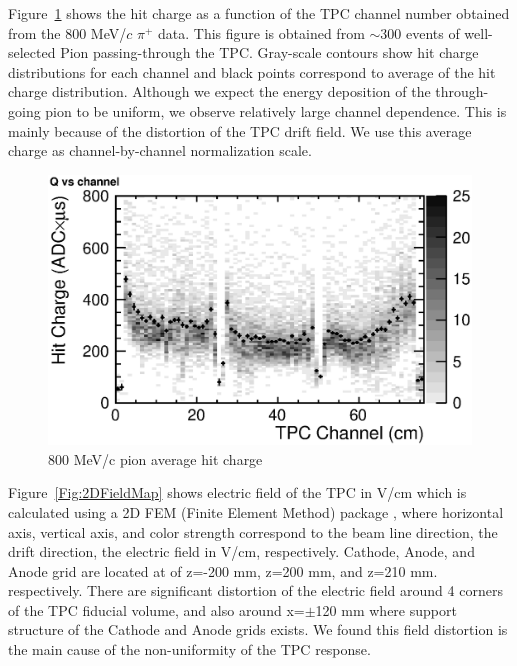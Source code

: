 Figure~\ref{fig:PionQvsCh} shows the hit charge as a function of 
the TPC channel number obtained from the 800 MeV/$c$ $\pi^+$ data. 
This figure is obtained from $\sim$300 events of well-selected Pion passing-through the TPC.
Gray-scale contours show hit charge distributions for
each channel and black points correspond to average of the hit charge distribution.  
Although we expect the energy deposition of the through-going pion to be uniform,
we observe relatively large channel dependence. 
This is mainly because of the distortion of the TPC drift field.
We use this average charge as channel-by-channel normalization scale.

\begin{figure}[htbp]
 \begin{center}
  \includegraphics[width=1.0\hsize]{fig/PionQvsCh.eps}
 \end{center}
 \caption{800 MeV/c pion average hit charge}
 \label{fig:PionQvsCh}
\end{figure}

Figure~\ref{Fig:2DFieldMap} shows electric field of the TPC in V/cm which 
is calculated using a 2D FEM (Finite Element Method) package \cite{Ref:FEMTET},
where horizontal axis, vertical axis, and color strength 
correspond to the beam line direction, the drift direction, the electric field in V/cm, respectively.
Cathode, Anode, and Anode grid are located at of z=-200 mm, z=200 mm, and z=210 mm. respectively.
There are significant distortion of the electric field around 4 corners of the TPC fiducial volume,
and also around x=$\pm$120 mm where support structure of the Cathode and Anode grids exists.
We found this field distortion is the main cause of the
non-uniformity of the TPC response.

